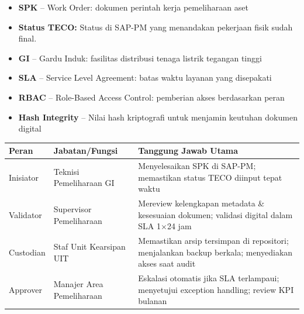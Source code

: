\documentclass[12pt,a4paper]{report}
\begin{document}
\begin{tcolorbox}[colback=fillgreen, colframe=plnblue!50, sharp corners, title={\small\bfseries Komponen 2: Definisi \& Akronim}]
\small
\begin{itemize}
    \item \textbf{SPK} -- Work Order: dokumen perintah kerja pemeliharaan aset
    \item \textbf{Status TECO:} Status di SAP-PM yang menandakan pekerjaan fisik sudah final.
    \item \textbf{GI} -- Gardu Induk: fasilitas distribusi tenaga listrik tegangan tinggi
    \item \textbf{SLA} -- Service Level Agreement: batas waktu layanan yang disepakati
    \item \textbf{RBAC} -- Role-Based Access Control: pemberian akses berdasarkan peran
    \item \textbf{Hash Integrity} -- Nilai hash kriptografi untuk menjamin keutuhan dokumen digital
\end{itemize}
\end{tcolorbox}

\begin{tcolorbox}[colback=fillgreen, colframe=plnblue!50, sharp corners, title={\small\bfseries Komponen 3: Peran \& Tanggung Jawab}]
\small
\renewcommand{\arraystretch}{1.5}
\begin{tabularx}{\textwidth}{@{} >{\raggedright\arraybackslash}X >{\raggedright\arraybackslash}X >{\raggedright\arraybackslash}X @{}}
\toprule
\textbf{Peran} & \textbf{Jabatan/Fungsi} & \textbf{Tanggung Jawab Utama} \\
\midrule
Inisiator & Teknisi Pemeliharaan GI & Menyelesaikan SPK di SAP-PM; memastikan status TECO diinput tepat waktu \\
\hline
Validator & Supervisor Pemeliharaan & Mereview kelengkapan metadata \& kesesuaian dokumen; validasi digital dalam SLA 1$\times$24 jam \\
\hline
Custodian & Staf Unit Kearsipan UIT & Memastikan arsip tersimpan di repositori; menjalankan backup berkala; menyediakan akses saat audit \\
\hline
Approver & Manajer Area Pemeliharaan & Eskalasi otomatis jika SLA terlampaui; menyetujui exception handling; review KPI bulanan \\
\bottomrule
\end{tabularx}
\end{tcolorbox}

\newpage
\end{document}
